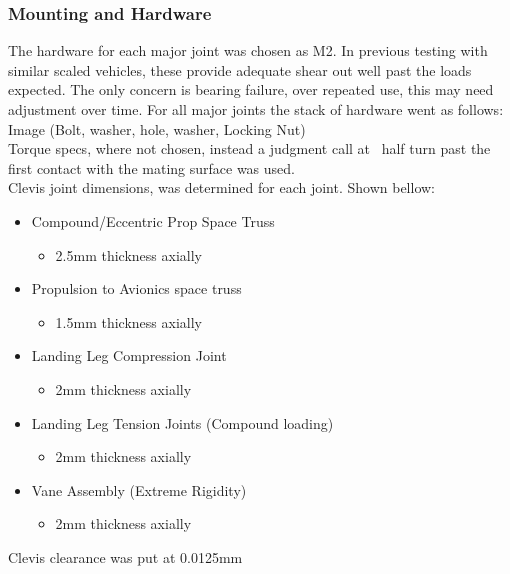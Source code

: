 \documentclass[12pt,letterpaper]{article}
\begin{document}
\subsubsection{Mounting and Hardware}

The hardware for each major joint was chosen as M2. In previous testing with similar scaled vehicles, these provide adequate shear out well past the loads expected. The only concern is bearing failure, over repeated use, this may need adjustment over time. For all major joints the stack of hardware went as follows:\\
Image (Bolt, washer, hole, washer, Locking Nut) \\

Torque specs, where not chosen, instead a judgment call at ~half turn past the first contact with the mating surface was used.\\

Clevis joint dimensions, was determined for each joint. Shown bellow:
\begin{itemize}
\item Compound/Eccentric Prop Space Truss
\begin{itemize}
\item 2.5\unit{\mm} thickness axially 
\end{itemize} 
\item Propulsion to Avionics space truss
\begin{itemize}
\item 1.5\unit{\mm} thickness axially
\end{itemize}
\item Landing Leg Compression Joint
\begin{itemize}
\item 2\unit{\mm} thickness axially
\end{itemize}
\item Landing Leg Tension Joints (Compound loading)
\begin{itemize}
\item 2\unit{\mm} thickness axially
\end{itemize}
\item Vane Assembly (Extreme Rigidity) 
\begin{itemize}
\item 2\unit{\mm} thickness axially 
\end{itemize}
\end{itemize}
Clevis clearance was put at 0.0125\unit{\mm}
\end{document}
